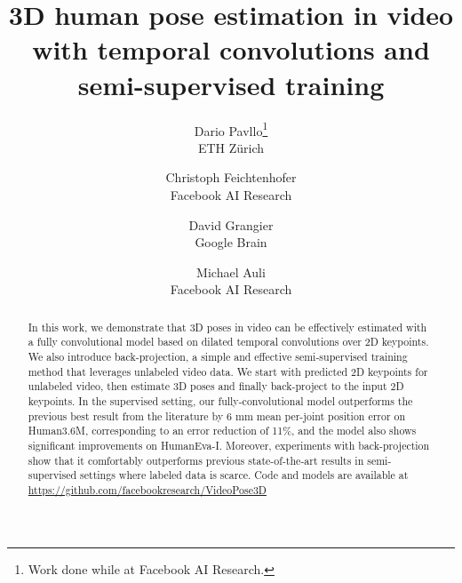 \documentclass[10pt,twocolumn,letterpaper]{article}
\begin{document}
\title{3D human pose estimation in video with temporal convolutions and \\ semi-supervised training}

\author{Dario Pavllo\thanks{Work done while at Facebook AI Research.}\\
ETH Zürich\\
\and
Christoph Feichtenhofer\\
Facebook AI Research\\
\and
David Grangier\footnotemark[1]\\
Google Brain\\
\and
Michael Auli\\
Facebook AI Research\\
}

\newcommand{\macomment}[1]{\textcolor{blue}{{*MA*: #1}}}
\newcommand{\mamark}[1]{\textcolor{blue}{{#1}}}
\newcommand{\dpcomment}[1]{\textcolor{red}{{*DP*: #1}}}
\newcommand{\dpmark}[1]{\textcolor{red}{{#1}}}
\newcommand{\cfcomment}[1]{\textcolor{blue}{{*CF*: #1}}}
\newcommand{\cfmark}[1]{\textcolor{blue}{{#1}}}

\maketitle
\thispagestyle{empty}

\begin{abstract}
    In this work, we demonstrate that 3D poses in video can be effectively estimated with a fully convolutional model based on dilated temporal convolutions over 2D keypoints.
    We also introduce back-projection, a simple and effective semi-supervised training method that leverages unlabeled video data.
    We start with predicted 2D keypoints for unlabeled video, then estimate 3D poses and finally back-project to the input 2D keypoints.
    In the supervised setting, our fully-convolutional model outperforms the previous best result from the literature by 6 mm mean per-joint position error on Human3.6M, corresponding to an error reduction of 11\%, and the model also shows significant improvements on HumanEva\nobreakdash-I.
    Moreover, experiments with back-projection show that it comfortably outperforms previous state-of-the-art results in semi-supervised settings where labeled data is scarce. Code and models are available at \url{https://github.com/facebookresearch/VideoPose3D}
\end{abstract}
\end{document}
